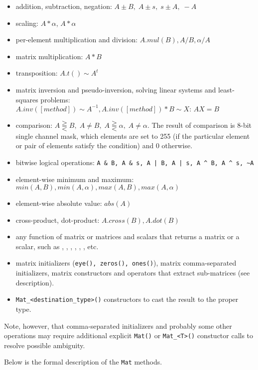 \begin{itemize}
    \item addition, subtraction, negation: $A \pm B,\;A \pm s,\;s \pm A,\;-A$
    \item scaling: $A*\alpha$, $A*\alpha$
    \item per-element multiplication and division: $A.mul(B), A/B, \alpha/A$
    \item matrix multiplication: $A*B$
    \item transposition: $A.t() \sim A^t$
    \item matrix inversion and pseudo-inversion, solving linear systems and least-squares problems:
        $A.inv([method]) \sim A^{-1}, A.inv([method])*B \sim X:\,AX=B$
    \item comparison: $A\gtreqqless B,\;A \ne B,\;A \gtreqqless \alpha,\;A \ne \alpha$.
          The result of comparison is 8-bit single channel mask, which elements are set to 255
          (if the particular element or pair of elements satisfy the condition) and 0 otherwise.
    \item bitwise logical operations: \texttt{A \& B, A \& s, A | B, A | s, A \textasciicircum{} B, A \textasciicircum{} s, \textasciitilde A}
    \item element-wise minimum and maximum: $min(A, B), min(A, \alpha), max(A, B), max(A, \alpha)$
    \item element-wise absolute value: $abs(A)$
    \item cross-product, dot-product: $A.cross(B), A.dot(B)$
    \item any function of matrix or matrices and scalars that returns a matrix or a scalar, such as
          , , , , ,
          ,  etc.
    \item matrix initializers (\texttt{eye(), zeros(), ones()}), matrix comma-separated initializers,
          matrix constructors and operators that extract sub-matrices (see  description).
    \item \verb"Mat_<destination_type>()" constructors to cast the result to the proper type.
\end{itemize}
Note, however, that comma-separated initializers and probably some other operations may require additional explicit \texttt{Mat()} or \verb"Mat_<T>()" constuctor calls to resolve possible ambiguity.

Below is the formal description of the \texttt{Mat} methods.


